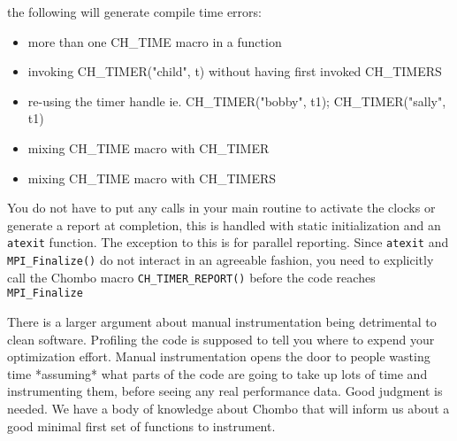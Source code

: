      the following will generate compile time errors:
\begin{itemize}
     \item more than one CH\_TIME macro in a function
     \item invoking CH\_TIMER("child", t) without having first invoked CH\_TIMERS
     \item re-using the timer handle ie. CH\_TIMER("bobby", t1); CH\_TIMER("sally", t1)
     \item mixing CH\_TIME macro with CH\_TIMER
     \item mixing CH\_TIME macro with CH\_TIMERS
 \end{itemize}

     You do not have to put any calls in your main routine to activate the clocks
     or generate a report at completion, this is handled with static initialization 
     and an {\tt atexit} function. The exception to this is for parallel reporting. Since
     {\tt atexit} and {\tt MPI\_Finalize()} do not interact in an agreeable fashion, you need
     to explicitly call the Chombo macro {\tt CH\_TIMER\_REPORT()} before the code reaches
     {\tt MPI\_Finalize}
    
  There is a larger argument about manual instrumentation being detrimental to clean software.
     Profiling the code is supposed to tell you where to expend your optimization effort.
     Manual instrumentation opens the door to people wasting time *assuming* what parts of the
     code are going to take up lots of time and instrumenting them, before seeing any real
     performance data.  Good judgment is needed.  We have a body of knowledge about Chombo
     that will inform us about a good minimal first set of functions to instrument. 
